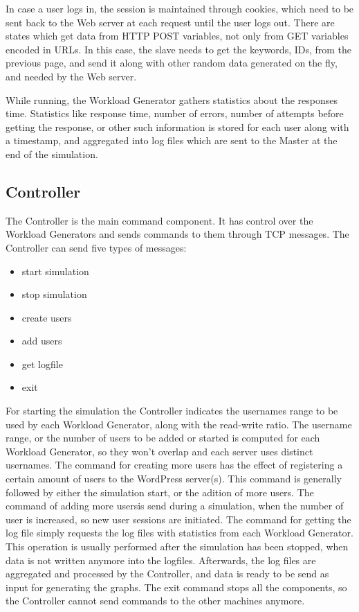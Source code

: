 In case a user logs in, the session is maintained through cookies, which need to be sent back to the Web server at each request until the user logs out. There are states which get data from HTTP POST variables, not only from GET variables encoded in URLs. In this case, the slave needs to get the keywords, IDs, from the previous page, and send it along with other random data generated on the fly, and needed by the Web server. 

While running, the Workload Generator gathers statistics about the responses time. Statistics like response time, number of errors, number of attempts before getting the response, or other such information is stored for each user along with a timestamp, and aggregated into log files which are sent to the Master at the end of the simulation.

\subsection{Controller}
\label{sub-sec:controller}

The Controller is the main command component. It has control over the Workload Generators and sends commands to them through TCP messages. The Controller can send five types of messages:
\begin{itemize}
 \item start simulation
 \item stop simulation
 \item create users
 \item add users
 \item get logfile
 \item exit
\end{itemize}

For starting the simulation the Controller indicates the usernames range to be used by each Workload Generator, along with the read-write ratio. The username range, or the number of users to be added or started is computed for each Workload Generator, so they won't overlap and each server uses distinct usernames. The command for creating more users has the effect of registering a certain amount of users to the WordPress server(s). This command is generally followed by either the simulation start, or the adition of more users. The command of adding more usersis send during a simulation, when the number of user is increased, so new user sessions are initiated. The command for getting the log file simply requests the log files with statistics from each Workload Generator. This operation is usually performed after the simulation has been stopped, when data is not written anymore into the logfiles. Afterwards, the log files are aggregated and processed by the Controller, and data is ready to be send as input for generating the graphs. The exit command stops all the components, so the Controller cannot send commands to the other machines anymore.


